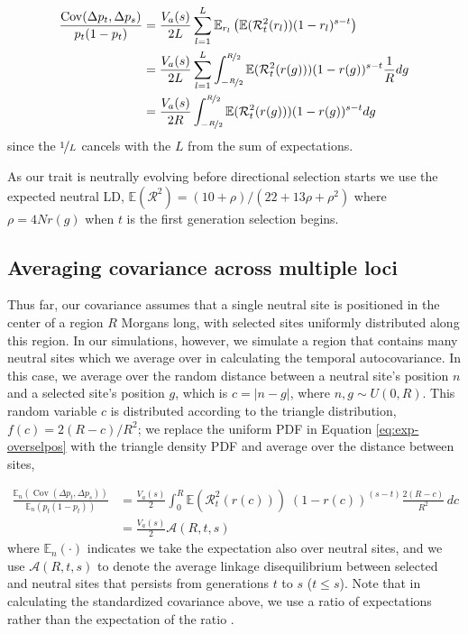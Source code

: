 \documentclass[11pt]{article}
\newcommand{\E}{\mathbb{E}}
\DeclareMathOperator{\cov}{Cov}
\begin{document}
\begin{subequations}
  \begin{align}
    \frac{\cov(\Delta p_t, \Delta p_s)}{p_t(1-p_t) } &= \frac{V_a(s)}{2L} \sum_{l=1}^L \E_{r_l} \left( \E(\mathcal{R}_{t}^2(r_l)) (1-r_l)^{s-t} \right)  \\
                                                     &= \frac{V_a(s)}{2L} \sum_{l=1}^L \int_{-\nicefrac{R}{2}}^{\nicefrac{R}{2}} \E(\mathcal{R}^2_{t}(r(g))) (1-r(g))^{s-t} \frac{1}{R} d g \label{eq:exp-overselpos} \\
                                                     &= \frac{V_a(s)}{2R} \int_{-\nicefrac{R}{2}}^{\nicefrac{R}{2}} \E(\mathcal{R}^2_{t}(r(g))) (1-r(g))^{s-t} d g
  \end{align}
\end{subequations}
%
since the $\nicefrac{1}{L}$ cancels with the $L$ from the sum of expectations.

As our trait is neutrally evolving before directional selection starts we use
the expected neutral LD, $\E(\mathcal{R}^2) = (10 + \rho)/(22 + 13 \rho +
\rho^2)$ where $\rho = 4Nr(g)$ \parencite{Ohta1969-ae,Hill1968-ue} when $t$ is
the first generation selection begins. 

\subsection{Averaging covariance across multiple loci}

Thus far, our covariance assumes that a single neutral site is positioned in
the center of a region $R$ Morgans long, with selected sites uniformly
distributed along this region. In our simulations, however, we simulate a
region that contains many neutral sites which we average over in calculating
the temporal autocovariance. In this case, we average over the random distance
between a neutral site's position $n$ and a selected site's position $g$, which
is $c = |n - g|$, where $n, g \sim U(0, R)$. This random variable $c$ is
distributed according to the triangle distribution, $f(c) = 2(R-c) / R^2$; we
replace the uniform PDF in Equation \eqref{eq:exp-overselpos} with the triangle
density PDF and average over the distance between sites,

\begin{align}
  \frac{\E_n(\cov(\Delta p_t, \Delta p_s))}{\E_n(p_t(1-p_t)) } %
  &= \frac{V_a(s)}{2} \int_0^R \E(\mathcal{R}_t^2(r(c))) \; (1-r(c))^{(s-t)} \frac{2(R-c)}{R^2} \,d c \\
  &= \frac{V_a(s)}{2} \mathcal{A}(R, t, s)
\end{align}
%
where $\E_n(\cdot)$ indicates we take the expectation also over neutral sites,
and we use $\mathcal{A}(R, t,s)$ to denote the average linkage disequilibrium
between selected and neutral sites that persists from generations $t$ to $s$
($t \le s$). Note that in calculating the standardized covariance above, we use
a ratio of expectations rather than the expectation of the ratio
\parencite{Bhatia2013-zy}.
\end{document}
